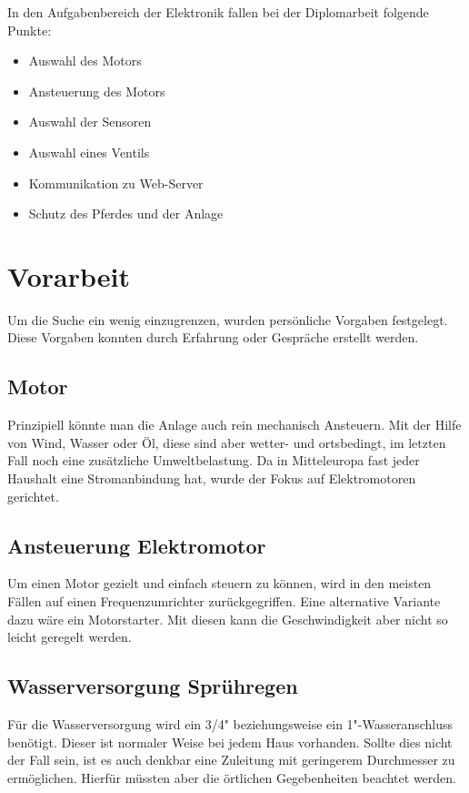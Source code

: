 In den Aufgabenbereich der Elektronik fallen bei der Diplomarbeit folgende Punkte:

\begin{itemize}
\item Auswahl des Motors
\item Ansteuerung des Motors
\item Auswahl der Sensoren
\item Auswahl eines Ventils
\item Kommunikation zu Web-Server
\item Schutz des Pferdes und der Anlage
\end{itemize}
\newpage
\section{Vorarbeit}
\label{sec:vorarbeit}

Um die Suche ein wenig einzugrenzen, wurden persönliche Vorgaben festgelegt.
Diese Vorgaben konnten durch Erfahrung oder Gespräche erstellt werden.

\subsection{Motor}
\label{sec:motor}

Prinzipiell könnte man die Anlage auch rein mechanisch Ansteuern. Mit der Hilfe von Wind, Wasser oder Öl, diese sind aber wetter- und ortsbedingt, im letzten Fall noch eine zusätzliche Umweltbelastung. Da in Mitteleuropa fast jeder Haushalt eine Stromanbindung hat, wurde der Fokus auf Elektromotoren gerichtet.

\subsection{Ansteuerung Elektromotor}
\label{sec:ansteuerungElektromotor}

Um einen Motor gezielt und einfach steuern zu können, wird in den meisten Fällen auf einen Frequenzumrichter zurückgegriffen. Eine alternative Variante dazu wäre ein Motorstarter. Mit diesen kann die Geschwindigkeit aber nicht so leicht geregelt werden. 

\subsection{Wasserversorgung Sprühregen}
\label{sec:wasserversorgungSpruehregen}

Für die Wasserversorgung wird ein 3/4"{} beziehungsweise ein 1"{}-Wasseranschluss benötigt. Dieser ist normaler Weise bei jedem Haus vorhanden. 
Sollte dies nicht der Fall sein, ist es auch denkbar eine Zuleitung mit geringerem Durchmesser zu ermöglichen. Hierfür müssten aber die örtlichen Gegebenheiten beachtet werden.

